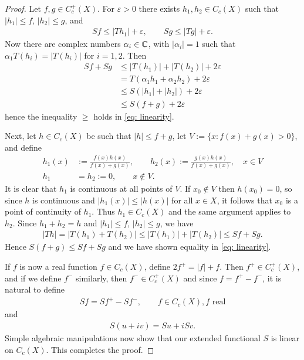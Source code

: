 \documentclass[../../main.tex]{subfiles}
\begin{document}
\begin{proof}
Let $f,g\in C_{c}^{+}(X)$. For $\varepsilon > 0$ there exists $h_{1},h_{2}\in C_{c}(X)$ such that $|h_{1}|\le f$, $|h_{2}|\le g$, and
\begin{align*}
	Sf \le |Th_{1}| + \varepsilon, \qquad Sg \le |Tg| + \varepsilon.
\end{align*}
Now there are complex numbers $\alpha_{i}\in \mathbb{C}$, with $|\alpha_{i}|=1$ such that $\alpha_{1}T(h_{i})=|T(h_{i})|$ for $i=1,2$.
Then
\begin{align*}
	Sf+Sg &\le |T(h_{1})| + |T(h_{2})| + 2\varepsilon \\
	&= T(\alpha_{1}h_{1} + \alpha_{2}h_{2}) + 2\varepsilon \\
	&\le S(|h_{1}| + |h_{2}|) + 2\varepsilon \\
	&\le S(f+g) + 2\varepsilon
\end{align*}
hence the inequality $\ge$ holds in \eqref{eq: linearity}.

Next, let $h\in C_{c}(X)$ be such that $|h| \le f + g$, let $V:=\{ x: f(x) + g(x) > 0 \}$, and define
\begin{align*}
	h_{1}(x)&:= \frac{f(x)h(x)}{f(x)+g(x)}, \qquad h_{2}(x):=\frac{g(x)h(x)}{f(x)+g(x)}, \quad x\in V \\
	h_{1}&=h_{2}:=0, \qquad x\not\in V.
\end{align*}
It is clear that $h_{1}$ is continuous at all points of $V$. If $x_{0}\not\in V$ then $h(x_{0})=0$, so since $h$ is continuous and $|h_{1}(x)| \le |h(x)|$ for all $x\in X$, it follows that $x_{0}$ is a point of continuity of $h_{1}$. Thus $h_{1}\in C_{c}(X)$ and the same argument applies to $h_{2}$.
Since $h_{1}+h_{2}=h$ and $|h_{1}| \le f$, $|h_{2}| \le g$, we have
\begin{align*}
	|Th| = |T(h_{1}) + T(h_{2})| \le |T(h_{1})| + |T(h_{2})| \le Sf + Sg.
\end{align*}
Hence $S(f+g) \le Sf + Sg$ and we have shown equality in \eqref{eq: linearity}.

If $f$ is now a real function $f\in C_{c}(X)$, define $2f^{+}=|f|+f$. Then $f^{+}\in C_{c}^{+}(X)$, and if we define $f^{-}$ similarly, then $f^{-}\in C_{c}^{+}(X)$ and since $f=f^{+}-f^{-}$, it is natural to define
\begin{align*}
	Sf=Sf^{+} - Sf^{-}, \qquad f\in C_{c}(X), f \text{ real}
\end{align*}
and
\begin{align*}
	S(u+iv)=Su+ iSv.
\end{align*}
Simple algebraic manipulations now show that our extended functional $S$ is linear on $C_{c}(X)$. This completes the proof.
\end{proof}
\end{document}
